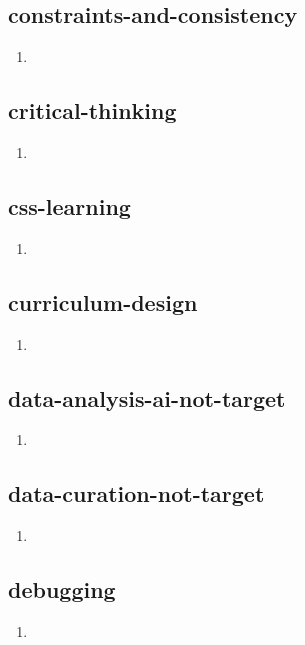 \documentclass{article}
\begin{document}
\subsection{constraints-and-consistency}
\begin{enumerate}
\item {}
\end{enumerate}

\subsection{critical-thinking}
\begin{enumerate}
\item {}
\end{enumerate}

\subsection{css-learning}
\begin{enumerate}
\item {}
\end{enumerate}

\subsection{curriculum-design}
\begin{enumerate}
\item {}
\end{enumerate}

\subsection{data-analysis-ai-not-target}
\begin{enumerate}
\item {}
\end{enumerate}

\subsection{data-curation-not-target}
\begin{enumerate}
\item {}
\end{enumerate}

\subsection{debugging}
\begin{enumerate}
\item {}
\end{enumerate}
\end{document}
